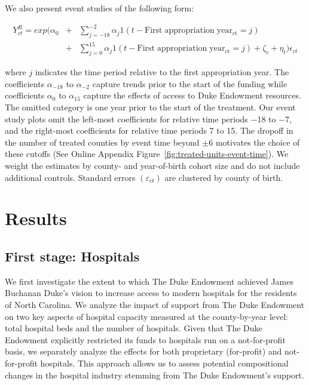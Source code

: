 \documentclass[12pt]{article}
\begin{document}
We also present event studies of the following form:
\vspace{-.25cm}
\begin{small}
\begin{eqnarray}
    Y^{R}_{ct} = exp(\alpha_0
        &+& \sum_{j=-18}^{-2}\alpha_j 1(t - \mathrm{First \; appropriation \; year_{ct}} = j) \nonumber \\
        &+& \sum_{j=0}^{15}\alpha_j 1(t - \mathrm{First \; appropriation \; year_{ct}} = j) + \zeta_c + \eta_t)\epsilon_{ct} \label{eq:event-study}
\end{eqnarray}
\end{small}
\noindent where $j$ indicates the time period relative to the first appropriation year.
The coefficients $\alpha_{-18}$ to $\alpha_{-2}$ capture trends prior to the start of the funding while coefficients $\alpha_{0}$ to $\alpha_{15}$ capture the effects of access to Duke Endowment resources.
The omitted category is one year prior to the start of the treatment. 
Our event study plots omit the left-most coefficients for relative time periods $-$18 to $-$7, and the right-most coefficients for relative time periods 7 to 15. 
The dropoff in the number of treated counties by event time beyond $\pm 6$ motivates the choice of these cutoffs (See Online Appendix Figure~\ref{fig:treated-units-event-time}). 
We weight the estimates by county- and year-of-birth cohort size and do not include additional controls. 
Standard errors $(\varepsilon_{ct})$ are clustered by county of birth. 


\section{Results} \label{sec:results}

\subsection{First stage: Hospitals} \label{subsec:first-stage}
\label{pg:hosp-first-stage}We first investigate the extent to which The Duke Endowment achieved James Buchanan Duke's vision to increase access to modern hospitals for the residents of North Carolina. 
We analyze the impact of support from The Duke Endowment on two key aspects of hospital capacity measured at the county-by-year level: total hospital beds and the number of hospitals. 
Given that The Duke Endowment explicitly restricted its funds to hospitals run on a not-for-profit basis, we separately analyze the effects for both proprietary (for-profit) and not-for-profit hospitals. 
This approach allows us to assess potential compositional changes in the hospital industry stemming from The Duke Endowment's support. 
\end{document}
